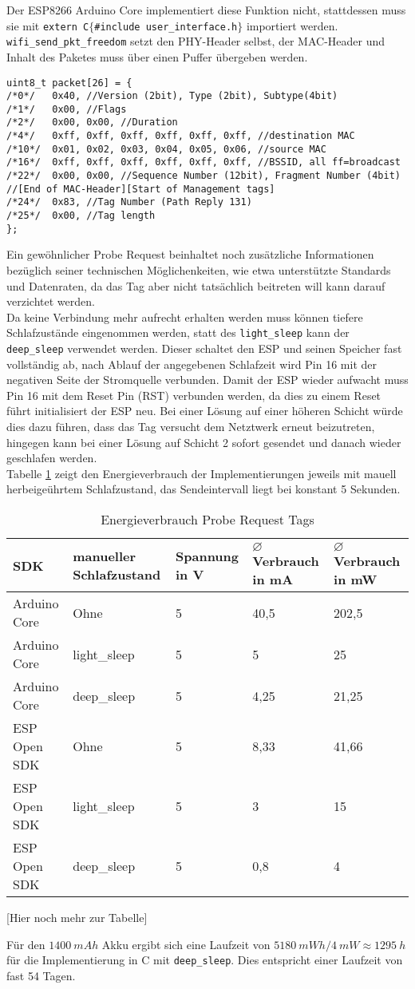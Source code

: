 Der ESP8266 Arduino Core implementiert diese Funktion nicht, stattdessen muss sie mit \texttt{extern \dq C\dq $\lbrace$\#include \dq user\_interface.h\dq $\rbrace$} importiert werden. \\
\texttt{wifi\_send\_pkt\_freedom} setzt den PHY-Header selbst, der MAC-Header und Inhalt des Paketes muss über einen Puffer übergeben werden.
\begin{verbatim}
uint8_t packet[26] = { 
/*0*/ 	0x40, //Version (2bit), Type (2bit), Subtype(4bit)
/*1*/ 	0x00, //Flags 
/*2*/ 	0x00, 0x00, //Duration
/*4*/   0xff, 0xff, 0xff, 0xff, 0xff, 0xff, //destination MAC
/*10*/  0x01, 0x02, 0x03, 0x04, 0x05, 0x06, //source MAC
/*16*/  0xff, 0xff, 0xff, 0xff, 0xff, 0xff, //BSSID, all ff=broadcast
/*22*/  0x00, 0x00, //Sequence Number (12bit), Fragment Number (4bit) 
//[End of MAC-Header][Start of Management tags]
/*24*/  0x83, //Tag Number (Path Reply 131) 
/*25*/ 	0x00, //Tag length
}; 
\end{verbatim}
Ein gewöhnlicher Probe Request beinhaltet noch zusätzliche Informationen bezüglich seiner technischen Möglichenkeiten, wie etwa unterstützte Standards und Datenraten, da das Tag aber nicht tatsächlich beitreten will kann darauf verzichtet werden. \\
Da keine Verbindung mehr aufrecht erhalten werden muss können tiefere Schlafzustände eingenommen werden, statt des \texttt{light\_sleep} kann der \texttt{deep\_sleep} verwendet werden.
Dieser schaltet den ESP und seinen Speicher fast vollständig ab, nach Ablauf der angegebenen Schlafzeit wird Pin 16 mit der negativen Seite der Stromquelle verbunden.
Damit der ESP wieder aufwacht muss Pin 16 mit dem Reset Pin (RST) verbunden werden, da dies zu einem Reset führt initialisiert der ESP neu.
Bei einer Lösung auf einer höheren Schicht würde dies dazu führen, dass das Tag versucht dem Netztwerk erneut beizutreten, hingegen kann bei einer Lösung auf Schicht 2 sofort gesendet und danach wieder geschlafen werden.\\
Tabelle \ref{table:probeconsumption} zeigt den Energieverbrauch der Implementierungen jeweils mit mauell herbeigeührtem Schlafzustand, das Sendeintervall liegt bei konstant 5 Sekunden.
\begin{table}[h]
	\centering
	\caption{Energieverbrauch Probe Request Tags}
	\label{table:probeconsumption}
	\begin{tabular}{p{3cm}|p{2.4cm}|p{2cm}|p{2cm}|p{2cm}}
		SDK & manueller Schlafzustand  & Spannung in V & $\varnothing$ Verbrauch in mA & $\varnothing$ Verbrauch in mW \\
		\hline
		Arduino Core & Ohne & 5 & 40,5 & 202,5 \\
		Arduino Core & light\_sleep & 5 & 5 & 25 \\
		Arduino Core & deep\_sleep & 5 & 4,25 & 21,25 \\
		ESP Open SDK & Ohne & 5 & 8,33 & 41,66 \\
		ESP Open SDK & light\_sleep & 5 & 3 & 15 \\
		ESP Open SDK & deep\_sleep & 5 & 0,8 & 4 \\
	\end{tabular}
\end{table}

[Hier noch mehr zur Tabelle]

Für den $1400\ mAh$ Akku ergibt sich eine Laufzeit von $5180\ mWh/4\ mW \approx 1295\ h$ für die Implementierung in C mit \texttt{deep\_sleep}.
Dies entspricht einer Laufzeit von fast 54 Tagen.
